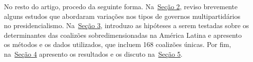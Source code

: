 No resto do artigo, procedo da seguinte forma. Na~\hyperref[sec:revisao]{Seção 2}, reviso brevemente alguns estudos que abordaram variações nos tipos de governos multipartidários no presidencialismo. Na~\hyperref[sec:analise]{Seção 3}, introduzo as hipóteses a serem testadas sobre os determinantes das coalizões sobredimensionadas na América Latina e apresento os métodos e os dados utilizados, que incluem 168 coalizões únicas. Por fim, na~\hyperref[sec:resultados]{Seção 4} apresento os resultados e os discuto na~\hyperref[sec:discussao]{Seção 5}.
